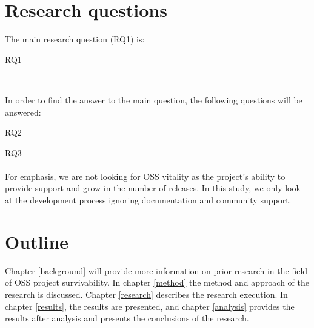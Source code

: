 \section{Research questions}
\label{questions}

The main research question (RQ1) is:\\

\begin{description}
	\item[RQ1] \emph{\researchQuestion}\\[0.3cm]
\end{description}

\noindent
In order to find the answer to the main question, the following
questions will be answered:
\begin{description}
	\item[RQ2] \emph{\subQuestionOne}
	\item[RQ3] \emph{\subQuestionTwo}
\end{description}

\paragraph{}
For emphasis, we are not looking for OSS vitality as the project's ability to
provide support and grow in the number of releases. In this study, we only look
at the development process ignoring documentation and community support.

\section{Outline}

Chapter \ref{background} will provide more information on prior research in the
field of OSS project survivability. In chapter \ref{method} the method and
approach of the research is discussed. Chapter \ref{research} describes the
research execution. In chapter \ref{results}, the results are presented, and
chapter \ref{analysis} provides the results after analysis and presents the
conclusions of the research.

